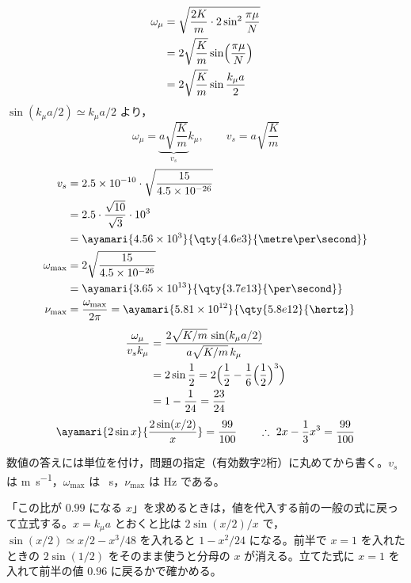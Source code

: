 \begin{align*}
  \omega_\mu&=\sqrt{\frac{2K}{m}\cdot2\sin^{2}\frac{\pi\mu}{N}}\\
  &=2\sqrt{\frac{K}{m}}\sin\Bigl(\frac{\pi\mu}{N}\Bigr)\\
  &=2\sqrt{\frac{K}{m}}\sin\frac{k_\mu a}{2}
\end{align*}
$\sin(k_\mu a/2)\simeq k_\mu a/2$ より，
\[ \omega_\mu=\underbrace{a\sqrt{\frac{K}{m}}}_{v_s}k_\mu,\qquad v_s=a\sqrt{\frac{K}{m}} \]
\begin{align*}
  v_s&=2.5\times10^{-10}\cdot\sqrt{\frac{15}{4.5\times10^{-26}}}\\
  &=2.5\cdot\frac{\sqrt{10}}{\sqrt{3}}\cdot10^{3}\\
  &=\ayamari{4.56\times10^{3}}{\qty{4.6e3}{\metre\per\second}}\\
  \omega_{\max}&=2\sqrt{\frac{15}{4.5\times10^{-26}}}\\
  &=\ayamari{3.65\times10^{13}}{\qty{3.7e13}{\per\second}}\\
  \nu_{\max}&=\frac{\omega_{\max}}{2\pi}=\ayamari{5.81\times10^{12}}{\qty{5.8e12}{\hertz}}
\end{align*}
\begin{align*}
  \frac{\omega_\mu}{v_sk_\mu}&=\frac{2\sqrt{K/m}\,\sin(k_\mu a/2)}{a\sqrt{K/m}\,k_\mu}\\
  &=2\sin\frac{1}{2}=2\Bigl(\frac{1}{2}-\frac{1}{6}\Bigl(\frac{1}{2}\Bigr)^{3}\Bigr)\\
  &=1-\frac{1}{24}=\frac{23}{24}
\end{align*}
\[ \ayamari{2\sin x}{\frac{2\sin(x/2)}{x}}=\frac{99}{100}\qquad\therefore\ 2x-\frac{1}{3}x^{3}=\frac{99}{100} \]
\item 数値の答えには単位を付け，問題の指定（有効数字2桁）に丸めてから書く。$v_s$ は \unit{\metre\per\second}，$\omega_{\max}$ は \unit{\per\second}，$\nu_{\max}$ は \unit{\hertz} である。
\item 「この比が $0.99$ になる $x$」を求めるときは，値を代入する前の一般の式に戻って立式する。$x=k_\mu a$ とおくと比は $2\sin(x/2)/x$ で，$\sin(x/2)\simeq x/2-x^{3}/48$ を入れると $1-x^{2}/24$ になる。前半で $x=1$ を入れたときの $2\sin(1/2)$ をそのまま使うと分母の $x$ が消える。立てた式に $x=1$ を入れて前半の値 $0.96$ に戻るかで確かめる。

